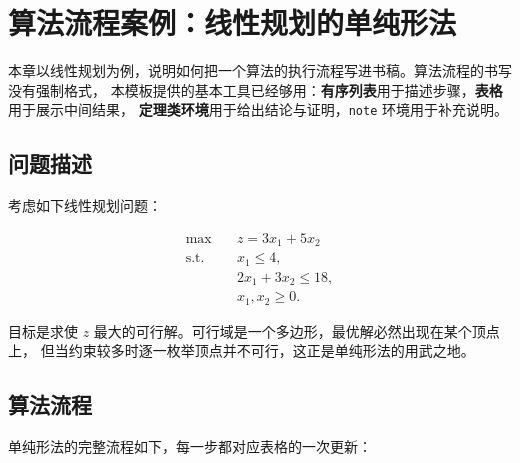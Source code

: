 %
%
\chapter{算法流程案例：线性规划的单纯形法}

本章以线性规划为例，说明如何把一个算法的执行流程写进书稿。算法流程的书写没有强制格式，
本模板提供的基本工具已经够用：\textbf{有序列表}用于描述步骤，\textbf{表格}用于展示中间结果，
\textbf{定理类环境}用于给出结论与证明，\lstinline{note} 环境用于补充说明。

\section{问题描述}

考虑如下线性规划问题：

\begin{equation}
  \begin{aligned}
    \max \quad & z = 3x_1 + 5x_2 \\
    \mathrm{s.t.}\quad & x_1 \leq 4, \\
                        & 2x_1 + 3x_2 \leq 18, \\
                        & x_1, x_2 \geq 0.
  \end{aligned}
  \label{eq:lp}
\end{equation}

目标是求使 $z$ 最大的可行解。可行域是一个多边形，最优解必然出现在某个顶点上，
但当约束较多时逐一枚举顶点并不可行，这正是单纯形法的用武之地。

\section{算法流程}

单纯形法的完整流程如下，每一步都对应表格的一次更新：

